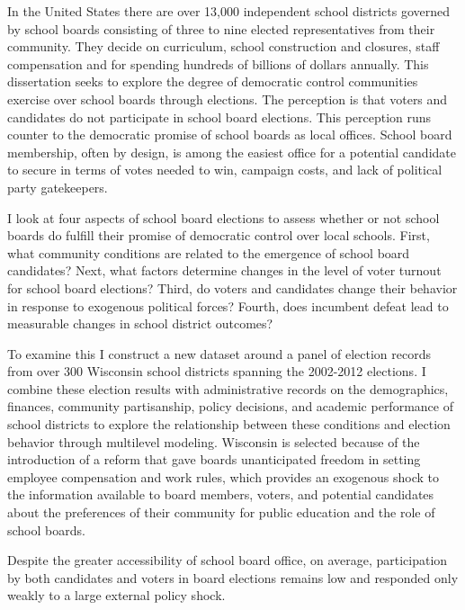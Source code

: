 In the United States there are over 13,000 independent school districts governed 
by school boards consisting of three to nine elected representatives from their 
community. They decide on curriculum, school construction and closures, 
staff compensation and for spending hundreds of billions of dollars annually. 
This dissertation seeks to explore the degree of democratic control communities 
exercise over school boards through elections. The perception is that voters 
and candidates do not participate in school board elections. This perception 
runs counter to the democratic promise of school boards as local offices. School 
board membership, often by design, is among the easiest office for a potential 
candidate to secure in terms of votes needed to win, campaign costs, and lack 
of political party gatekeepers. 

I look at four aspects of school board elections to assess whether or not school 
boards do fulfill their promise of democratic control over local schools. First, 
what community conditions are related to the emergence of school board candidates? 
Next, what factors determine changes in the level of voter turnout for school 
board elections? Third, do voters and candidates change their behavior in 
response to exogenous political forces? Fourth, does incumbent defeat lead 
to measurable changes in school district outcomes? 

To examine this I construct a new dataset around a panel of election 
records from over 300 Wisconsin school districts spanning the 2002-2012 elections. 
I combine these election results with administrative records on the demographics, 
finances, community partisanship, policy decisions, and academic performance 
of school districts to explore the relationship between these conditions and 
election behavior through multilevel modeling. Wisconsin is selected because of 
the introduction of a reform that gave boards unanticipated freedom in setting 
employee compensation and work rules, which provides an exogenous shock to the 
information available to board members, voters, and potential candidates about 
the preferences of their community for public education and the role of school boards. 

Despite the greater accessibility of school board office, on average, participation 
by both candidates and voters in board elections remains low and responded only 
weakly to a large external policy shock. 
